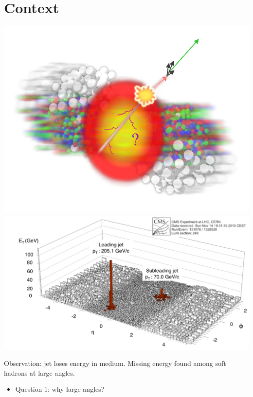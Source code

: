 \documentclass[pstricks,mathserif]{beamer}
\begin{document}
\section{Context}

\begin{frame}

\includegraphics[width=0.9\linewidth]{jet-quenching.jpg}
\endminipage\hfill
{}
\includegraphics[width=1\linewidth]{CMS_JetQ.png}
\endminipage\hfill

Observation: jet loses energy in medium. Missing energy found among soft hadrons at large angles.%
\begin{itemize}
\item Question 1: why large angles?
\end{itemize}


\end{frame}
\end{document}
